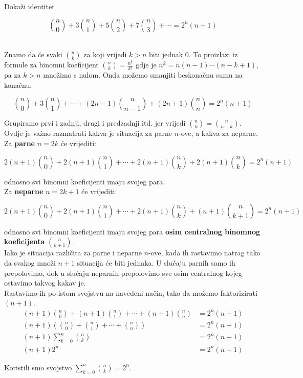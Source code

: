 \documentclass[exam.tex]{subfiles}
\begin{document}
	\begin{task}
		Dokaži identitet
	
		\[ \binom{n}{0} + 3 \binom{n}{1} + 5 \binom{n}{2} + 7 \binom{n}{3} + \cdots = 2^n (n + 1) \] \\[1em]
	\end{task}
	
	Znamo da će svaki \( \displaystyle \binom{n}{k} \) za koji vrijedi \( k > n \) biti jednak 0. To proizlazi iz formule za binomni koeficijent \( \displaystyle \binom{n}{k} = \frac{n^{\underline{k}}}{k!} \) gdje je \( n^{\underline{k}} = n (n - 1) \cdots (n - k + 1) \), pa za \( k > n\) množimo s nulom. Onda možemo smanjiti beskonačnu sumu na konačnu.
	
	\[ \binom{n}{0} + 3 \binom{n}{1} + \cdots + (2n - 1) \binom{n}{n - 1} + (2n + 1) \binom{n}{n} = 2^n (n + 1) \]
	
	Grupiramo prvi i zadnji, drugi i predzadnji itd. jer vrijedi \( \binom{n}{k} = \binom{n}{n - k} \). \\
	
	Ovdje je važno razmatrati kakva je situacija za parne \( n \)-ove, a kakva za neparne. Za \textbf{parne} \( n = 2k \) će vrijediti:
	
	\[ 2(n + 1) \binom{n}{0} + 2(n + 1) \binom{n}{1} + \cdots + 2(n + 1) \binom{n}{k} + 2(n + 1) \binom{n}{k} = 2^n (n + 1) \]
	
	odnosno svi binomni koeficijenti imaju svojeg para. \\
	
	Za \textbf{neparne} \( n = 2k + 1 \) će vrijediti:
	
	\[ 2(n + 1) \binom{n}{0} + 2(n + 1) \binom{n}{1} + \cdots 
	+ 2(n + 1) \binom{n}{k}  + (n + 1) \binom{n}{k + 1} = 2^n (n + 1) \]
	
	odnosno svi binomni koeficijenti imaju svojeg para \textbf{osim centralnog binomnog koeficijenta} \( \binom{n}{k + 1} \). \\
	
	Iako je situacija različita za parne i neparne \( n \)-ove, kada ih rastavimo natrag tako da svakog množi \( n + 1 \) situacija će biti jednaka. U slučaju parnih samo ih prepolovimo, dok u slučaju neparnih prepolovimo sve osim centralnog kojeg ostavimo takvog kakav je. \\
	
	Rastavimo ih po istom svojstvu na navedeni način, tako da možemo faktorizirati \( (n + 1) \).
	\begin{align*}
		(n + 1) \binom{n}{0} + (n + 1) \binom{n}{1} + \cdots + (n + 1) \binom{n}{n} &= 2^n (n + 1) \\
		(n + 1) \left (\binom{n}{0} + \binom{n}{1} + \cdots + \binom{n}{n} \right) &= 2^n (n + 1) \\
		(n + 1) \sum\limits^n_{k=0} \binom{n}{k} &= 2^n (n + 1) \\
		(n + 1) 2^n &= 2^n (n + 1)
	\end{align*}
	
	Koristili smo svojstvo \( \sum\limits^n_{k=0} \binom{n}{k} = 2^n \).
\end{document}
